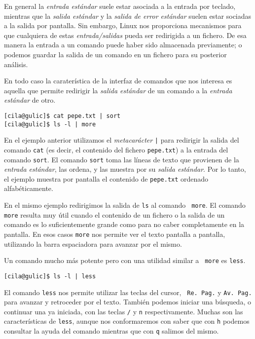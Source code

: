 En general la {\em entrada estándar} suele estar asociada a la entrada
por teclado, mientras que la {\em salida estándar} y la {\em salida de
error estándar}  suelen estar sociadas  a la salida por  pantalla. Sin
embargo, Linux nos proporciona mecanismos para que cualquiera de estas
{\em entrada/salidas} pueda ser redirigida a un fichero. De esa manera
la entrada  a un  comando puede haber  sido almacenada  previamente; o
podemos  guardar  la salida  de  un  comando  en  un fichero  para  su
posterior análisis.

En  todo caso  la caraterística  de la  interfaz de  comandos que  nos
interesa es aquella que permite  redirigir la {\em salida estándar} de
un comando a la {\em entrada estándar} de otro.

\begin{verbatim}
[cila@gulic]$ cat pepe.txt | sort
[cila@gulic]$ ls -l | more
\end{verbatim}

En el ejemplo  anterior utilizamos el {\em metacarácter}  {\tt |} para
redirigir la salida del comando {\tt  cat} (es decir, el contenido del
fichero  {\tt pepe.txt})  a  la  entrada del  comando  {\tt sort}.  El
comando {\tt  sort} toma las líneas  de texto que
provienen de la {\em entrada estándar},  las ordena, y las muestra por
su  {\em  salida estándar}.  Por  lo  tanto,  el ejemplo  muestra  por
pantalla el contenido de {\tt pepe.txt} ordenado alfabéticamente.

En el mismo ejemplo redirigimos la  salida de {\tt ls} al comando {\tt
more}.  El comando  {\tt more}  resulta muy  útil
cuando  el contenido  de  un fichero  o  la salida  de  un comando  es
lo  suficientemente grande  como  para no  caber  completamente en  la
pantalla. En esos casos {\tt more} nos permite ver el texto pantalla a
pantalla, utilizando la barra espaciadora para avanzar por el mismo.

Un comando  mucho más  potente pero  con una  utilidad similar  a {\tt
more} es {\tt less}.

\begin{verbatim}
[cila@gulic]$ ls -l | less
\end{verbatim}

El comando {\tt less} nos permite utilizar las teclas del cursor, {\tt
Re. Pag.}  y {\tt Av.  Pag.} para avanzar  y retroceder por  el texto.
También podemos iniciar una búsqueda, o continuar una ya iniciada, con
las  teclas  {\tt  /}  y  {\tt  n}  respectivamente.  Muchas  son  las
características de {\tt less}, aunque  nos conformaremos con saber que
con {\tt  h} podemos consultar la  ayuda del comando mientras  que con
{\tt q} salimos del mismo.

